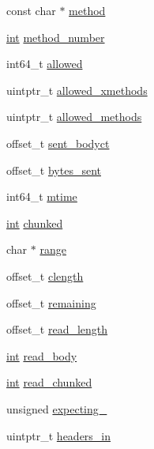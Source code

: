\begin{DoxyCompactItemize}
\item 
const char $\ast$ \hyperlink{structrequest__rec_a54de55544c4c4c25d67a08980184c653}{method}
\item 
\hyperlink{pcre_8txt_a42dfa4ff673c82d8efe7144098fbc198}{int} \hyperlink{structrequest__rec_a5d11eb89be0765988fde175e0d5ccfb7}{method\+\_\+number}
\item 
int64\+\_\+t \hyperlink{structrequest__rec_a106d46c4b12825895e1e7878a2c5fe24}{allowed}
\item 
uintptr\+\_\+t \hyperlink{structrequest__rec_a890f87e42ce5e2f6a042e47e7a3c6b41}{allowed\+\_\+xmethods}
\item 
uintptr\+\_\+t \hyperlink{structrequest__rec_abb260fc3c407dda8e6c58c8fff302820}{allowed\+\_\+methods}
\item 
offset\+\_\+t \hyperlink{structrequest__rec_ae8efe02c7668a4eaa7c714a41cc30b0e}{sent\+\_\+bodyct}
\item 
offset\+\_\+t \hyperlink{structrequest__rec_a8e626c2b8ebc0156e1517cce657cdb90}{bytes\+\_\+sent}
\item 
int64\+\_\+t \hyperlink{structrequest__rec_a25d43eb990fee28e18daefe42bf1d996}{mtime}
\item 
\hyperlink{pcre_8txt_a42dfa4ff673c82d8efe7144098fbc198}{int} \hyperlink{structrequest__rec_ab090d5baf7083066585d9303048da954}{chunked}
\item 
char $\ast$ \hyperlink{structrequest__rec_ab1bcc4965124331f6362be8be7920d54}{range}
\item 
offset\+\_\+t \hyperlink{structrequest__rec_ab47335647b1243f686e7b9c47980ca4e}{clength}
\item 
offset\+\_\+t \hyperlink{structrequest__rec_ae76abf0f18b4876bc014a74239319811}{remaining}
\item 
offset\+\_\+t \hyperlink{structrequest__rec_a50f96bf2cf5fd8377ead4c3f89c03eb7}{read\+\_\+length}
\item 
\hyperlink{pcre_8txt_a42dfa4ff673c82d8efe7144098fbc198}{int} \hyperlink{structrequest__rec_a3e497fa2bdce1f63d6a4e896e8a0687e}{read\+\_\+body}
\item 
\hyperlink{pcre_8txt_a42dfa4ff673c82d8efe7144098fbc198}{int} \hyperlink{structrequest__rec_acd29d29a1757e70bdddf64ee8eaed963}{read\+\_\+chunked}
\item 
unsigned \hyperlink{structrequest__rec_a58f8821d9463cfded49110353ced165d}{expecting\+\_}
\item 
uintptr\+\_\+t \hyperlink{structrequest__rec_a5497da6c01af49acf70a4a9b975c1c83}{headers\+\_\+in}
\item 

\end{DoxyCompactItemize}
